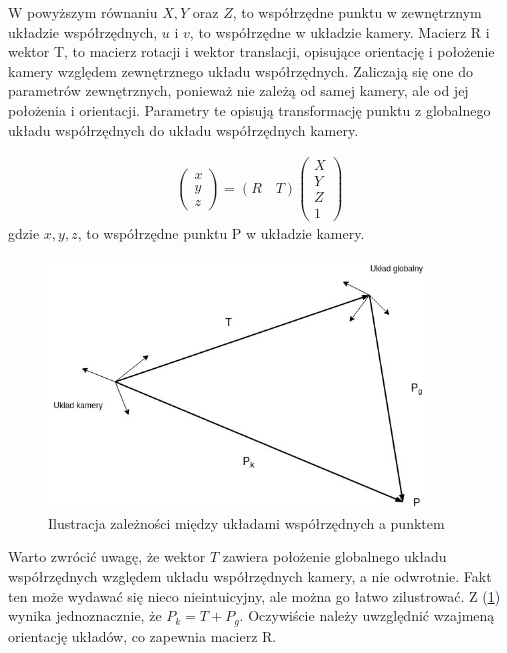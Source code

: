\documentclass[oneside, eng]{mgr}
\begin{document}
W powyższym równaniu $X, Y$ oraz $Z$, to współrzędne punktu w zewnętrznym układzie współrzędnych,
$u$ i $v$, to współrzędne w układzie kamery.
Macierz R i wektor T, to macierz rotacji i wektor translacji, opisujące orientację i położenie kamery względem zewnętrznego układu współrzędnych. Zaliczają się one do parametrów zewnętrznych, ponieważ nie zależą od samej kamery, ale od jej położenia i orientacji. Parametry te opisują transformację punktu z globalnego układu współrzędnych do układu współrzędnych kamery. 

\begin{align*}
	\left( \begin{array}{l} x \\ y \\ z \end{array} \right) =
	(R \quad T)
	\left( \begin{array}{l}
		X \\	Y \\	Z \\	1
	\end{array} \right) 
\end{align*}
gdzie $x, y, z$, to współrzędne punktu P w układzie kamery.


\begin{figure}
\centering
	\includegraphics[width=0.90\textwidth]{pinhole.jpg}\par\vspace{1cm}
\caption{Ilustracja zależności między układami współrzędnych a punktem}
	\label{fig:camera_coordinate_systems}
\end{figure}

Warto zwrócić uwagę, że wektor $T$ zawiera położenie globalnego układu współrzędnych względem układu współrzędnych kamery, a nie odwrotnie. Fakt ten może wydawać się nieco nieintuicyjny, ale można go łatwo zilustrować. Z (\ref{fig:camera_coordinate_systems}) wynika jednoznacznie, że $P_k = T + P_g$. Oczywiście należy uwzględnić wzajmeną orientację układów, co zapewnia macierz R.
\end{document}
